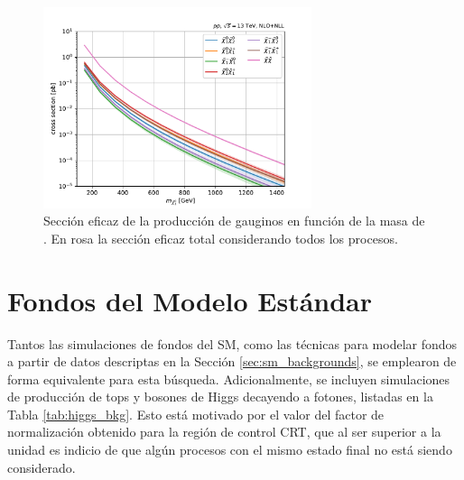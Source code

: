 \begin{figure}
  \centering
  \includegraphics[width=0.7\textwidth]{images/analysis_EWK/SUSY_EWK_xsecs_m.pdf}
  \caption{Sección eficaz de la producción de gauginos en función de la masa de \ninoone. En rosa la sección eficaz total considerando todos los procesos.}
  \label{fig:SUSY_EWK_xs}
\end{figure}



\section{Fondos del Modelo Estándar}

Tantos las simulaciones de fondos del SM, como las técnicas para modelar fondos a partir de datos descriptas en la Sección \ref{sec:sm_backgrounds}, se emplearon de forma equivalente para esta búsqueda. Adicionalmente, se incluyen simulaciones de producción de tops y bosones de Higgs decayendo a fotones, listadas en la Tabla \ref{tab:higgs_bkg}. Esto está motivado por el valor del factor de normalización obtenido para la región de control CRT, que al ser superior a la unidad es indicio de que algún procesos con el mismo estado final no está siendo considerado.

\begin{table}[h!]
  \centering
  \caption{Muestras de de producción de tops y bosones de Higgs decayendo a fotones utilizadas en el análisis con producción electrodébil, donde se especifica su generador, sección eficaz, $k$-factor y eficiencia de filtro.}
  \label{tab:higgs_bkg}
\end{table}



